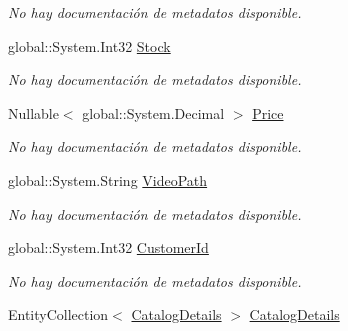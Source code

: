 \begin{DoxyCompactItemize}
\begin{DoxyCompactList}\small\item\em No hay documentación de metadatos disponible. \end{DoxyCompactList}\item 
global\-::\-System.\-Int32 \hyperlink{class_microsoft_1_1_samples_1_1_kinect_1_1_basic_interactions_1_1_commercial_products_a2e5fe9c0d854dd9ce355962168e11606}{Stock}
\begin{DoxyCompactList}\small\item\em No hay documentación de metadatos disponible. \end{DoxyCompactList}\item 
Nullable$<$ global\-::\-System.\-Decimal $>$ \hyperlink{class_microsoft_1_1_samples_1_1_kinect_1_1_basic_interactions_1_1_commercial_products_abae825290ec8eaf6896a309b2085706c}{Price}
\begin{DoxyCompactList}\small\item\em No hay documentación de metadatos disponible. \end{DoxyCompactList}\item 
global\-::\-System.\-String \hyperlink{class_microsoft_1_1_samples_1_1_kinect_1_1_basic_interactions_1_1_commercial_products_a0b97b85ce0c4abfff271af4a81e22874}{Video\-Path}
\begin{DoxyCompactList}\small\item\em No hay documentación de metadatos disponible. \end{DoxyCompactList}\item 
global\-::\-System.\-Int32 \hyperlink{class_microsoft_1_1_samples_1_1_kinect_1_1_basic_interactions_1_1_commercial_products_a397ac3c1996e97087819bc2711d13897}{Customer\-Id}
\begin{DoxyCompactList}\small\item\em No hay documentación de metadatos disponible. \end{DoxyCompactList}\item 
Entity\-Collection$<$ \hyperlink{class_microsoft_1_1_samples_1_1_kinect_1_1_basic_interactions_1_1_catalog_details}{Catalog\-Details} $>$ \hyperlink{class_microsoft_1_1_samples_1_1_kinect_1_1_basic_interactions_1_1_commercial_products_a0d9b209279d2e5ee45e2b7ef018fce73}{Catalog\-Details}

\end{DoxyCompactItemize}
